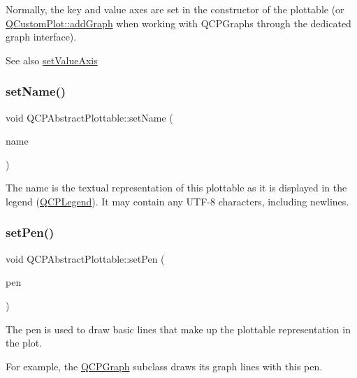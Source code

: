 Normally, the key and value axes are set in the constructor of the plottable (or \hyperlink{class_q_custom_plot_a6fb2873d35a8a8089842d81a70a54167}{Q\+Custom\+Plot\+::add\+Graph} when working with Q\+C\+P\+Graphs through the dedicated graph interface).

\begin{DoxySeeAlso}{See also}
\hyperlink{class_q_c_p_abstract_plottable_a71626a07367e241ec62ad2c34baf21cb}{set\+Value\+Axis} 
\end{DoxySeeAlso}
\mbox{\label{class_q_c_p_abstract_plottable_ab79c7ba76bc7fa89a4b3580e12149f1f}} 
\subsubsection{\texorpdfstring{set\+Name()}{setName()}}
{\footnotesize\ttfamily void Q\+C\+P\+Abstract\+Plottable\+::set\+Name (\begin{DoxyParamCaption}\item[{const Q\+String \&}]{name }\end{DoxyParamCaption})}

The name is the textual representation of this plottable as it is displayed in the legend (\hyperlink{class_q_c_p_legend}{Q\+C\+P\+Legend}). It may contain any U\+T\+F-\/8 characters, including newlines. \mbox{\label{class_q_c_p_abstract_plottable_ab74b09ae4c0e7e13142fe4b5bf46cac7}} 
\subsubsection{\texorpdfstring{set\+Pen()}{setPen()}}
{\footnotesize\ttfamily void Q\+C\+P\+Abstract\+Plottable\+::set\+Pen (\begin{DoxyParamCaption}\item[{const Q\+Pen \&}]{pen }\end{DoxyParamCaption})}

The pen is used to draw basic lines that make up the plottable representation in the plot.

For example, the \hyperlink{class_q_c_p_graph}{Q\+C\+P\+Graph} subclass draws its graph lines with this pen.

